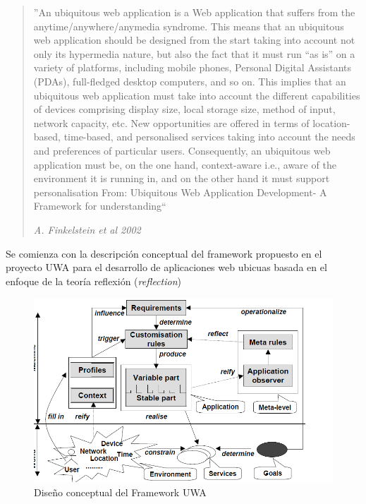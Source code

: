 \begin{quote}
''An ubiquitous web application is a Web application that suffers from the
anytime/anywhere/anymedia syndrome. This means that an ubiquitous
web application should be designed from the start taking into account
not only its hypermedia nature, but also the fact that it must run “as is”
on a variety of platforms, including mobile phones, Personal Digital
Assistants (PDAs), full-fledged desktop computers, and so on. This
implies that an ubiquitous web application must take into account the
different capabilities of devices comprising display size, local storage
size, method of input, network capacity, etc. New opportunities are
offered in terms of location-based, time-based, and personalised
services taking into account the needs and preferences of particular
users. Consequently, an ubiquitous web application must be, on the one
hand, context-aware i.e., aware of the environment it is running in, and
on the other hand it must support personalisation
From: Ubiquitous Web Application Development- A Framework for understanding``

\begin{flushright}
\textit{A. Finkelstein et al 2002}
\end{flushright}
\end{quote} 


Se comienza con la descripción conceptual del framework propuesto en el
proyecto UWA para el desarrollo de aplicaciones web ubicuas basada en el
enfoque de la teoría reflexión (\textit{reflection})



\begin{figure}[t]
\begin{center}
 \includegraphics[width=5 in,totalheight=4 in] {Ch1/Figuras/UWAFramework2.png}
\caption{Dise\~no conceptual del Framework UWA}\label{fig:uwaFramework}
\end{center}
\end{figure}



